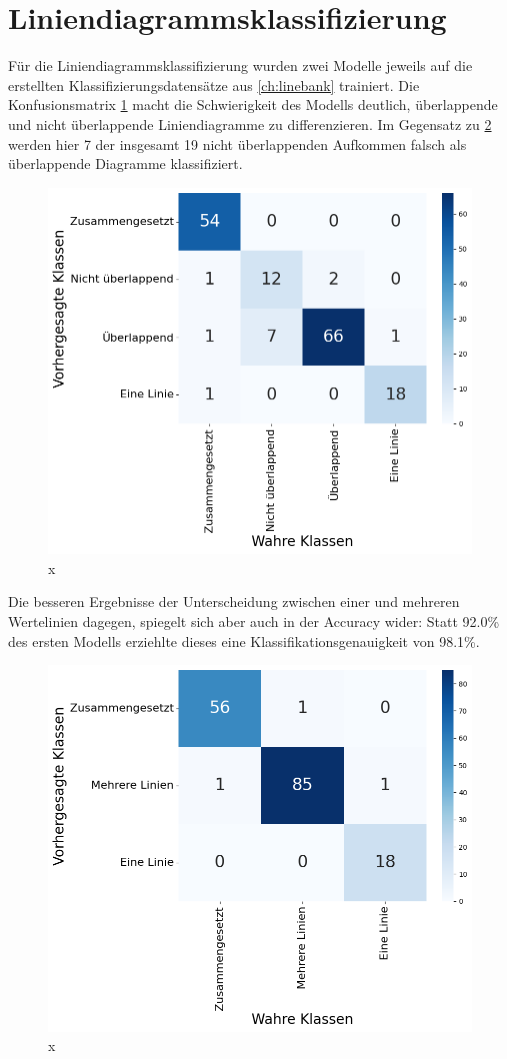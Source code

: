 \section{Liniendiagrammsklassifizierung}

Für die Liniendiagrammsklassifizierung wurden zwei Modelle jeweils auf die erstellten Klassifizierungsdatensätze aus \ref{ch:linebank} trainiert. Die Konfusionsmatrix \ref{fig:val_v1_matrix} macht die Schwierigkeit des Modells deutlich, überlappende und nicht überlappende Liniendiagramme zu differenzieren. Im Gegensatz zu \ref{fig:val_v2_matrix} werden hier 7 der insgesamt 19 nicht überlappenden Aufkommen falsch als überlappende Diagramme klassifiziert.

\begin{figure}[H]
    \centering
    \captionsetup{width=.75\linewidth}
    \includegraphics[width=.75\textwidth]{Experimente/img/classify/val_v1/matrix.png}
    \caption{ x}
    \label{fig:val_v1_matrix}
\end{figure}

Die besseren Ergebnisse der Unterscheidung zwischen einer und mehreren Wertelinien dagegen, spiegelt sich aber auch in der Accuracy wider: Statt 92.0\% des ersten Modells erziehlte dieses eine Klassifikationsgenauigkeit von 98.1\%.

\begin{figure}[H]
    \centering
    \captionsetup{width=.75\linewidth}
    \includegraphics[width=.75\textwidth]{Experimente/img/classify/val_v2/matrix.png}
    \caption{ x}
    \label{fig:val_v2_matrix}
\end{figure}

